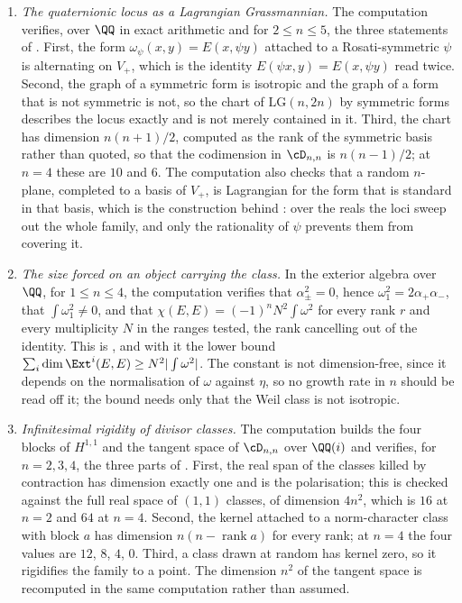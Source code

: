 \begin{enumerate}[label=\textup{(\Roman*)},leftmargin=*]
\item \emph{The quaternionic locus as a Lagrangian Grassmannian.} The
  computation verifies, over $\QQ$ in exact arithmetic and for $2\le n\le5$,
  the three statements of . First, the form
  $\omega_{\psi}(x,y)=E(x,\psi y)$ attached to a Rosati-symmetric $\psi$ is
  alternating on $V_{+}$, which is the identity $E(\psi x,y)=E(x,\psi y)$
  read twice. Second, the graph of a symmetric form is isotropic and the
  graph of a form that is not symmetric is not, so the chart of
  $\mathrm{LG}(n,2n)$ by symmetric forms describes the locus exactly and is
  not merely contained in it. Third, the chart has dimension $n(n+1)/2$,
  computed as the rank of the symmetric basis rather than quoted, so that the
  codimension in $\cD_{n,n}$ is $n(n-1)/2$; at $n=4$ these are $10$ and $6$.
  The computation also checks that a random $n$-plane, completed to a basis
  of $V_{+}$, is Lagrangian for the form that is standard in that basis,
  which is the construction behind : over the reals
  the loci sweep out the whole family, and only the rationality of $\psi$
  prevents them from covering it.

\item \emph{The size forced on an object carrying the class.} In the
  exterior algebra over $\QQ$, for $1\le n\le4$, the computation verifies that
  $\alpha_{\pm}^{2}=0$, hence $\omega_{1}^{2}=2\alpha_{+}\alpha_{-}$, that
  $\int\omega_{1}^{2}\ne0$, and that $\chi(E,E)=(-1)^{n}N^{2}\int\omega^{2}$
  for every rank $r$ and every multiplicity $N$ in the ranges tested, the rank
  cancelling out of the identity. This is , and with it
  the lower bound $\sum_{i}\dim\Ext^{i}(E,E)\ge N^{2}|\int\omega^{2}|$. The
  constant is not dimension-free, since it depends on the normalisation of
  $\omega$ against $\eta$, so no growth rate in $n$ should be read off it;
  the bound needs only that the Weil class is not isotropic.

\item \emph{Infinitesimal rigidity of divisor classes.} The computation
  builds the four blocks of $H^{1,1}$ and the tangent space of $\cD_{n,n}$
  over $\QQ(i)$ and verifies, for $n=2,3,4$, the three parts of
  . First, the real span of the classes killed by
  contraction has dimension exactly one and is the polarisation; this is
  checked against the full real space of $(1,1)$ classes, of dimension
  $4n^{2}$, which is $16$ at $n=2$ and $64$ at $n=4$. Second, the kernel
  attached to a norm-character class with block $a$ has dimension
  $n(n-\operatorname{rank}a)$ for every rank; at $n=4$ the four values are
  $12$, $8$, $4$, $0$. Third, a class drawn at random has kernel zero, so it
  rigidifies the family to a point. The dimension $n^{2}$ of the tangent
  space is recomputed in the same computation rather than assumed.


\end{enumerate}
